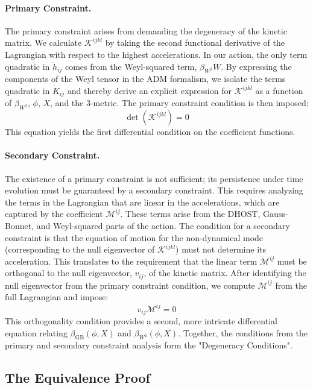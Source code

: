 \documentclass[twocolumn]{aastex631}
\begin{document}
\paragraph{Primary Constraint.} The primary constraint arises from demanding the degeneracy of the kinetic matrix. We calculate $\mathcal{K}^{ijkl}$ by taking the second functional derivative of the Lagrangian with respect to the highest accelerations. In our action, the only term quadratic in $\ddot{h}_{ij}$ comes from the Weyl-squared term, $\beta_{W^2} W$. By expressing the components of the Weyl tensor in the ADM formalism, we isolate the terms quadratic in $\dot{K}_{ij}$ and thereby derive an explicit expression for $\mathcal{K}^{ijkl}$ as a function of $\beta_{W^2}$, $\phi$, $X$, and the 3-metric. The primary constraint condition is then imposed:
\begin{equation}
\det(\mathcal{K}^{ijkl}) = 0
\end{equation}
This equation yields the first differential condition on the coefficient functions.

\paragraph{Secondary Constraint.} The existence of a primary constraint is not sufficient; its persistence under time evolution must be guaranteed by a secondary constraint. This requires analyzing the terms in the Lagrangian that are linear in the accelerations, which are captured by the coefficient $\mathcal{M}^{ij}$. These terms arise from the DHOST, Gauss-Bonnet, and Weyl-squared parts of the action. The condition for a secondary constraint is that the equation of motion for the non-dynamical mode (corresponding to the null eigenvector of $\mathcal{K}^{ijkl}$) must not determine its acceleration. This translates to the requirement that the linear term $\mathcal{M}^{ij}$ must be orthogonal to the null eigenvector, $v_{ij}$, of the kinetic matrix. After identifying the null eigenvector from the primary constraint condition, we compute $\mathcal{M}^{ij}$ from the full Lagrangian and impose:
\begin{equation}
v_{ij}\mathcal{M}^{ij} = 0
\end{equation}
This orthogonality condition provides a second, more intricate differential equation relating $\beta_{\text{GB}}(\phi, X)$ and $\beta_{W^2}(\phi, X)$. Together, the conditions from the primary and secondary constraint analysis form the "Degeneracy Conditions".

\subsection{The Equivalence Proof}
\end{document}
